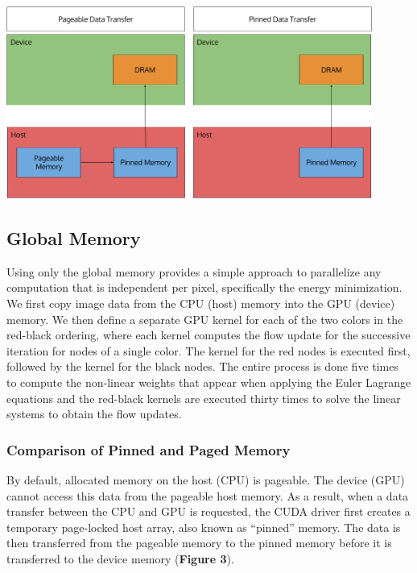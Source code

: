 \documentclass[english]{article}
\begin{document}
	\begin{center}
	\includegraphics[width=120mm]{results/images/2_pinned_paged.png}
	\end{center}		

	\subsection{Global Memory}
	Using only the global memory provides a simple approach to parallelize any computation that is independent per pixel, specifically the energy minimization. We first copy image data from the CPU (host) memory into the GPU (device) memory. We then define a separate GPU kernel for each of the two colors in the red-black ordering, where each kernel computes the flow update for the successive iteration for nodes of a single color. The kernel for the red nodes is executed first, followed by the kernel for the black nodes. The entire process is done five times to compute the non-linear weights that appear when applying the Euler Lagrange equations and the red-black kernels are executed thirty times to solve the linear systems to obtain the flow updates. 

	\subsubsection{Comparison of Pinned and Paged Memory}
	By default, allocated memory on the host (CPU) is pageable. The device (GPU) cannot access this data from the pageable host memory. As a result, when a data transfer between the CPU and GPU is requested, the CUDA driver first creates a temporary page-locked host array, also known as “pinned” memory. The data is then transferred from the pageable memory to the pinned memory before it is transferred to the device memory (\textbf{Figure 3}).\newline
\end{document}
